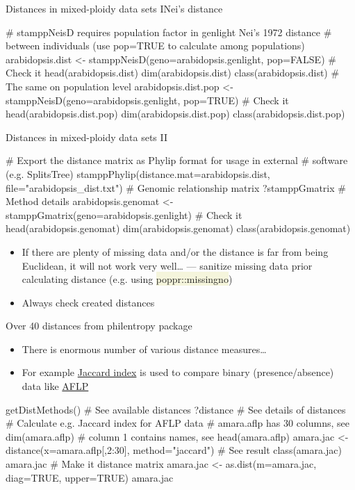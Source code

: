 \documentclass[compress, ucs, xelatex, 11pt, xcolor=svgnames, aspectratio=169,
	hyperref={
		bookmarks=true,
		unicode=true,
		colorlinks=true,
		pdftitle={Molecular data in R},
		plainpages=false,
		pdfauthor={Vojtech Zeisek},
		pdfsubject={Course about phylogeny and evolution in R},
		pdfcreator={XeLaTeX},
		pdfkeywords={R, evolution, phylogeny, molecular data},
		linkcolor=Crimson, %
		anchorcolor=Magenta, %
		citecolor=Magenta, %
		filecolor=Magenta, %
		menucolor=Magenta, %
		urlcolor=DodgerBlue, %
		pdftex},
	url={hyphens, lowtilde} %
	]{beamer}
\renewcommand{\texttt}[1]{\colorbox{Beige}{{\ttfamily #1}}}
\begin{document}
\begin{frame}[fragile]{Distances in mixed-ploidy data sets I}{Nei's distance}
	\begin{spluscode}
    # stamppNeisD requires population factor in genlight Nei's 1972 distance
    # between individuals (use pop=TRUE to calculate among populations)
    arabidopsis.dist <- stamppNeisD(geno=arabidopsis.genlight, pop=FALSE)
    # Check it
    head(arabidopsis.dist)
    dim(arabidopsis.dist)
    class(arabidopsis.dist)
    # The same on population level
    arabidopsis.dist.pop <- stamppNeisD(geno=arabidopsis.genlight, pop=TRUE)
    # Check it
    head(arabidopsis.dist.pop)
    dim(arabidopsis.dist.pop)
    class(arabidopsis.dist.pop)
	\end{spluscode}
\end{frame}

\begin{frame}[fragile]{Distances in mixed-ploidy data sets II}
	\begin{spluscode}
    # Export the distance matrix as Phylip format for usage in external
    # software (e.g. SplitsTree)
    stamppPhylip(distance.mat=arabidopsis.dist, file="arabidopsis_dist.txt")
    # Genomic relationship matrix
    ?stamppGmatrix # Method details
    arabidopsis.genomat <- stamppGmatrix(geno=arabidopsis.genlight)
    # Check it
    head(arabidopsis.genomat)
    dim(arabidopsis.genomat)
    class(arabidopsis.genomat)
	\end{spluscode}
	\begin{itemize}
		\item If there are plenty of missing data and/or the distance is far from being Euclidean, it will not work very well\ldots{ } --- sanitize missing data prior calculating distance (e.g. using \texttt{poppr::missingno})
		\item Always check created distances
	\end{itemize}
\end{frame}

\begin{frame}[fragile]{Over 40 distances from philentropy package}
	\begin{itemize}
		\item There is enormous number of various distance measures\ldots
		\item For example \href{https://en.wikipedia.org/wiki/Jaccard_index}{Jaccard index} is used to compare binary (presence/absence) data like \href{https://en.wikipedia.org/wiki/Amplified_fragment_length_polymorphism}{AFLP}
	\end{itemize}
	\begin{spluscode}
    getDistMethods() # See available distances
    ?distance # See details of distances
    # Calculate e.g. Jaccard index for AFLP data
    # amara.aflp has 30 columns, see dim(amara.aflp)
    # column 1 contains names, see head(amara.aflp)
    amara.jac <- distance(x=amara.aflp[,2:30], method="jaccard")
    # See result
    class(amara.jac)
    amara.jac
    # Make it distance matrix
    amara.jac <- as.dist(m=amara.jac, diag=TRUE, upper=TRUE)
    amara.jac
	\end{spluscode}
\end{frame}
\end{document}
